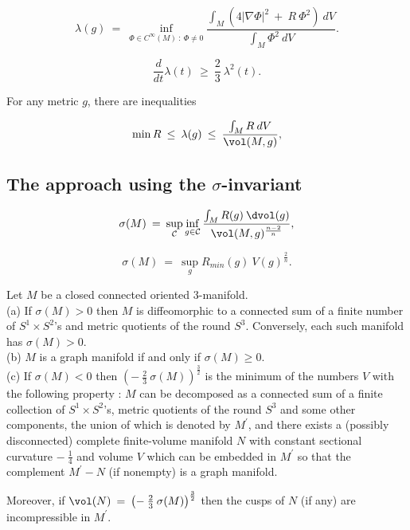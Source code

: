 \begin{equation} \label{Rayleigh}
\lambda(g) \: = \: \inf_{\Phi \in C^\infty(M) \: : \:
\Phi \neq 0} \frac{\int_M \left( 4 |\nabla \Phi|^2 \: + \:
R \: \Phi^2 \right) \: dV}{\int_M \Phi^2 \: dV}.
\end{equation}

\begin{equation} \label{ll}
\frac{d}{dt} \lambda(t) \: \ge \: \frac23 \:
\lambda^2(t).
\end{equation}

For any metric $g$, there are inequalities

\begin{equation} \label{test}
\min R \: \le \: \lambda(g) \: \le \: \frac{\int_M R \: dV}{\vol(M, g)},
\end{equation}

\subsection{The approach using the $\sigma$-invariant}

\begin{equation} \label{yamabe}
\sigma(M) \: = \: \sup_{{\mathcal C}} \inf_{g \in {\mathcal C}}
\frac{\int_M R(g) \: \dvol(g)}{\vol(M, g)^{\frac{n-2}{n}}},
\end{equation}

\begin{equation} \label{testt}
\sigma(M) \: = \: \sup_{g} R_{min}(g) \: V(g)^{\frac2n}.
\end{equation}

\begin{proposition}
  \label{prop:kl-alternative-proof-cusp-incompressibility-characterization-graph-manifolds}
 \label{propYamabe}
Let $M$ be a closed connected oriented $3$-manifold. \\
(a) If $\sigma(M) > 0$ then $M$ is
diffeomorphic to a connected sum of a finite number of
$S^1 \times S^2$'s and metric quotients of the round $S^3$.
Conversely, each such manifold has $\sigma(M) > 0$. \\
(b) $M$ is a graph manifold if and only if $\sigma(M)
\ge 0$. \\
(c) If $\sigma(M) < 0$
 then
$\left( - \: \frac23 \: \sigma(M)
\right)^{\frac32}$ is the minimum
of the numbers
$V$ with the following property : $M$ can be decomposed as a connected sum
of a finite collection of $S^1 \times S^2$'s, metric quotients of the round
$S^3$ and some other components, the union of which is denoted by
$M^\prime$, and there exists a (possibly disconnected) complete
finite-volume
manifold $N$ with constant sectional curvature $- \: \frac14$ and
volume $V$ which can be embedded in $M^\prime$ so that the
complement $M^\prime - N$ (if nonempty) is a graph manifold.

Moreover, if
$\vol(N) \: = \: \left( - \: \frac23 \: \sigma(M)
\right)^{\frac32}$
then the
cusps of $N$ (if any) are incompressible in $M^\prime$.
\end{proposition}

